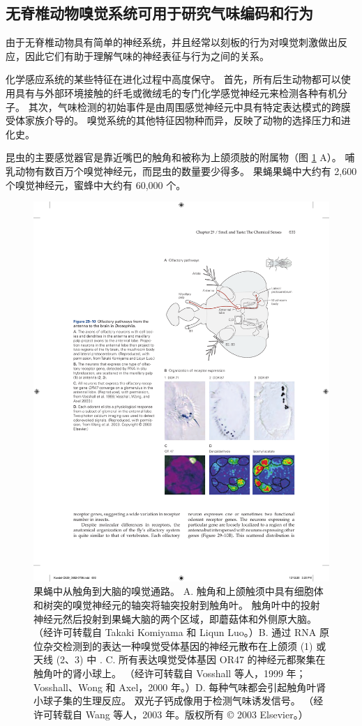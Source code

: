 \subsection{无脊椎动物嗅觉系统可用于研究气味编码和行为}
由于无脊椎动物具有简单的神经系统，并且经常以刻板的行为对嗅觉刺激做出反应，因此它们有助于理解气味的神经表征与行为之间的关系。

化学感应系统的某些特征在进化过程中高度保守。 首先，所有后生动物都可以使用具有与外部环境接触的纤毛或微绒毛的专门化学感觉神经元来检测各种有机分子。 其次，气味检测的初始事件是由周围感觉神经元中具有特定表达模式的跨膜受体家族介导的。 嗅觉系统的其他特征因物种而异，反映了动物的选择压力和进化史。

昆虫的主要感觉器官是靠近嘴巴的触角和被称为上颌须肢的附属物（图 \ref{fig:29_10} A）。 
哺乳动物有数百万个嗅觉神经元，而昆虫的数量要少得多。 果蝇果蝇中大约有 2,600 个嗅觉神经元，蜜蜂中大约有 60,000 个。

\begin{figure}[htbp]
	\centering
	\includegraphics[width=0.6\linewidth]{chap29/fig_29_10}
	\caption{果蝇中从触角到大脑的嗅觉通路。 A. 触角和上颌触须中具有细胞体和树突的嗅觉神经元的轴突将轴突投射到触角叶。 触角叶中的投射神经元然后投射到果蝇大脑的两个区域，即蘑菇体和外侧原大脑。 （经许可转载自 Takaki Komiyama 和 Liqun Luo。）B. 通过 RNA 原位杂交检测到的表达一种嗅觉受体基因的神经元散布在上颌须 (1) 或天线 (2、3) 中 . C. 所有表达嗅觉受体基因 OR47 的神经元都聚集在触角叶的肾小球上。 （经许可转载自 Vosshall 等人，1999 年；Vosshall、Wong 和 Axel，2000 年。）D. 每种气味都会引起触角叶肾小球子集的生理反应。 双光子钙成像用于检测气味诱发信号。 （经许可转载自 Wang 等人，2003 年。版权所有 © 2003 Elsevier。）}
	\label{fig:29_10}
\end{figure}

